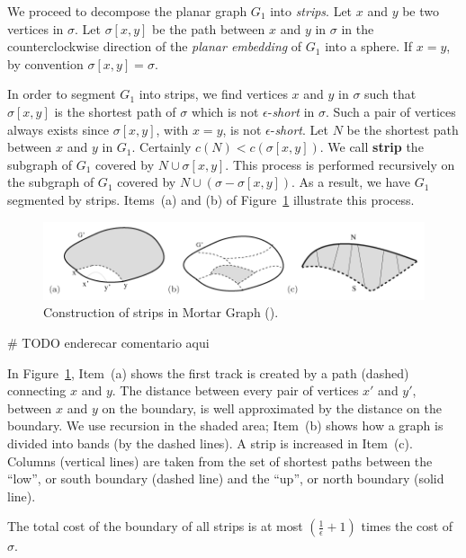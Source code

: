 We proceed to decompose the planar graph \(G_1\) into \textit{strips}. Let \(x\) and \(y\) be two vertices in \(\sigma\). Let \(\sigma[x, y]\) be the path between \(x\) and \(y\) in \(\sigma\) in the counterclockwise direction of the \textit{planar embedding} of \(G_1\) into a sphere. If \(x = y\), by convention \(\sigma[x, y] = \sigma\).

In order to segment \(G_1\) into strips, we find vertices \(x\) and \(y\) in \(\sigma\) such that \(\sigma[x, y]\) is the shortest path of \(\sigma\) which is not \(\epsilon\)-\textit{short} in \(\sigma\). Such a pair of vertices always exists since \(\sigma[x, y]\), with \(x = y\), is not \(\epsilon\)-\textit{short}. Let \(N\) be the shortest path between \(x\) and \(y\) in \(G_1\). Certainly \(c(N) < c(\sigma[x, y])\). We call \textbf{strip} the subgraph of \(G_1\) covered by \(N \cup \sigma[x, y]\). This process is performed recursively on the subgraph of \(G_1\) covered by \(N \cup (\sigma - \sigma[x, y])\). As a result, we have \(G_1\) segmented by strips. Items~(a) and (b) of Figure~\ref{fig:mortar2} illustrate this process.

\begin{figure}[h]
    \centering
    \includegraphics[scale=0.5]{imgs/mortar2.png}
    \caption{Construction of strips in Mortar Graph (\cite{Borradaile2009b}).}
    \label{fig:mortar2}
\end{figure}

# TODO enderecar comentario aqui

In Figure~\ref{fig:mortar2}, Item~(a) shows the first track is created by a path (dashed) connecting \(x\) and \(y\). The distance between every pair of vertices \(x'\) and \(y'\), between \(x\) and \(y\) on the boundary, is well approximated by the distance on the boundary. We use recursion in the shaded area; Item~(b) shows how a graph is divided into bands (by the dashed lines). A strip is increased in Item~(c). Columns (vertical lines) are taken from the set of shortest paths between the ``low'', or south boundary (dashed line) and the ``up'', or north boundary (solid line).

\begin{flemma} \label{strip_length}
The total cost of the boundary of all strips is at most \((\frac{1}{\epsilon} + 1)\) times the cost of \(\sigma\).
\end{flemma}

